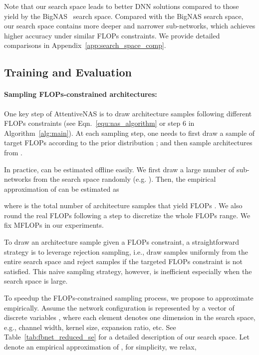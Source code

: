 \documentclass[final]{cvpr}
\theoremstyle{definition}
\begin{document}
Note that our search space leads to better DNN solutions 
compared to those yield by the BigNAS~\cite{yu2020bignas} search space. 
Compared with the BigNAS search space, our search space contains more deeper and narrower sub-networks,
which achieves higher accuracy under similar FLOPs constraints. We provide detailed comparisons in Appendix~\ref{app:search_space_comp}.

\subsection{Training and Evaluation}
\label{sec:imp_prep}


\paragraph{Sampling FLOPs-constrained architectures:} 
\label{sec:sampling_architectures}
One key step of AttentiveNAS is to draw architecture samples following different FLOPs constraints (see Eqn.~\eqref{equ:nas_algorithm} or step 6 in Algorithm~\ref{alg:main}). 
At each sampling step, one needs to first draw a sample of target FLOPs  according to the prior distribution ; and then sample  architectures  from .

In practice, 
 can be estimated offline easily.
We first draw a large number of  sub-networks from the search space randomly (e.g. ). 
Then, the empirical approximation of  can be estimated as 

where  is the total number of architecture samples that yield FLOPs . We also round the real FLOPs following a step  to discretize the whole FLOPs range. We fix  MFLOPs in our experiments.


To draw an architecture sample given a FLOPs constraint, a straightforward strategy is to leverage rejection sampling, i.e., draw samples uniformly from the entire search space and reject samples if the targeted FLOPs constraint is not satisfied. This naive sampling strategy, however, is inefficient especially when the search space is large.


To speedup the FLOPs-constrained sampling process, we propose to approximate  empirically.
Assume the network configuration is represented by a vector of discrete variables ,
where each element  denotes one dimension in the search space, 
e.g., channel width, kernel size, expansion ratio, etc.
See Table~\ref{tab:fbnet_reduced_se} for a detailed description of our search space. 
Let  denote an empirical approximation of , 
for simplicity, we relax, 
\end{document}
